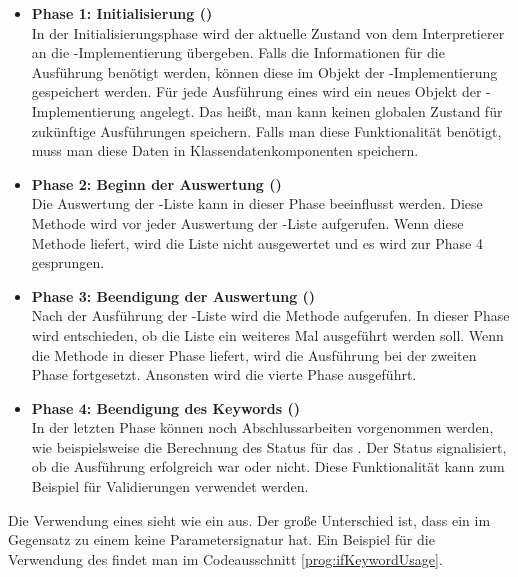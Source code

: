 \begin{itemize}

\item \textbf{Phase 1: Initialisierung ()}\\
In der Initialisierungsphase wird der aktuelle Zustand von dem Interpretierer an die -Implementierung übergeben. Falls die Informationen für die Ausführung benötigt werden, können diese im Objekt der -Implementierung gespeichert werden. Für jede Ausführung eines  wird ein neues Objekt der -Implementierung angelegt. Das heißt, man kann keinen globalen Zustand für zukünftige Ausführungen speichern. Falls man diese Funktionalität benötigt, muss man diese Daten in Klassendatenkomponenten speichern.\\

\item \textbf{Phase 2: Beginn der Auswertung ()}\\
Die Auswertung der -Liste kann in dieser Phase beeinflusst werden. Diese Methode wird vor jeder Auswertung der -Liste aufgerufen. Wenn diese Methode  liefert, wird die Liste nicht ausgewertet und es wird zur Phase 4 gesprungen.\\

\item \textbf{Phase 3: Beendigung der Auswertung ()}\\
Nach der Ausführung der -Liste wird die Methode  aufgerufen. In dieser Phase wird entschieden, ob die Liste ein weiteres Mal ausgeführt werden soll. Wenn die Methode in dieser Phase  liefert, wird die Ausführung bei der zweiten Phase fortgesetzt. Ansonsten wird die vierte Phase ausgeführt.\\

\item \textbf{Phase 4: Beendigung des Keywords ()}\\
In der letzten Phase können noch Abschlussarbeiten vorgenommen werden, wie beispielsweise die Berechnung des Status für das . Der Status signalisiert, ob die Ausführung erfolgreich war oder nicht. Diese Funktionalität kann zum Beispiel für Validierungen verwendet werden.

\end{itemize}

\SuperPar
Die Verwendung eines  sieht wie ein  aus. Der große Unterschied ist, dass ein  im Gegensatz zu einem  keine Parametersignatur hat. Ein Beispiel für die Verwendung des  findet man im Codeausschnitt \ref{prog:ifKeywordUsage}.

